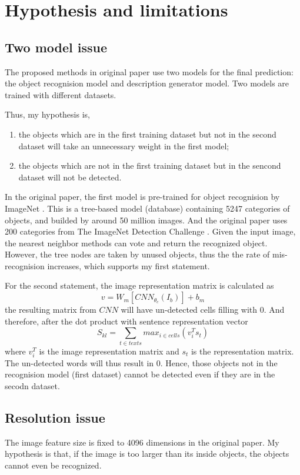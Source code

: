\documentclass[10pt,twocolumn,letterpaper]{article}
\begin{document}
\section{Hypothesis and limitations}
\subsection{Two model issue}
The proposed methods in original paper use two models for the final prediction:
the object recognision model and description generator model.
Two models are trained with different datasets.

Thus, my hypothesis is,
\begin{enumerate}
    \item the objects which are in the first training dataset but not in the second dataset
          will take an unnecessary weight in the first model;
    \item the objects which are not in the first training dataset but in the sencond dataset
          will not be detected.
\end{enumerate}

In the original paper, the first model is pre-trained for object recognision by ImageNet \cite{imagenet}.
This is a tree-based model (database) containing 5247 categories of objects, and builded by around 50 million images.
And the original paper uses 200 categories from The ImageNet Detection Challenge \cite{inch}.
Given the input image, the nearest neighbor methods can vote and return the recognized object.
However, the tree nodes are taken by unused objects, thus the the rate of mis-recognision increases, which supports my first statement.

For the second statement, the image representation matrix is calculated as
$$v = W_{m} \left [ CNN_{\theta_{c}}(I_{b}) \right ] + b_{m}$$
the resulting matrix from $CNN$ will have un-detected cells filling with $0$.
And therefore, after the dot product with sentence representation vector
$$S_{kl} = \sum_{t \in texts} max_{i \in cells}(v_{i}^{T}s_{t})$$
where $v_{i}^{T}$ is the image representation matrix and $s_{t}$ is the representation matrix.
The un-detected words will thus result in $0$.
Hence, those objects not in the recognision model (first dataset) cannot be detected even if they are in the secodn dataset.


\subsection{Resolution issue}
The image feature size is fixed to 4096 dimensions in the original paper.
My hypothesis is that, if the image is too larger than its inside objects, the objects cannot even be recognized.
\end{document}

